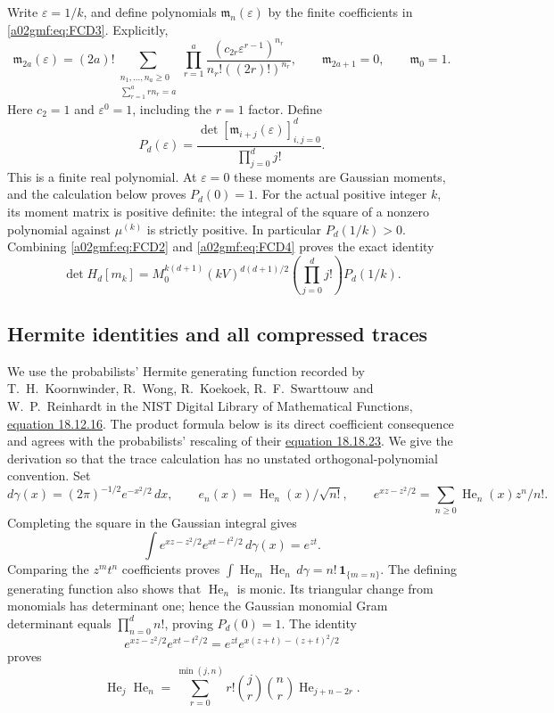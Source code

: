 \documentclass[11pt,a4paper]{article}
\begin{document}
Write \(\varepsilon=1/k\), and define polynomials \(\mathfrak m_n(\varepsilon)\)
by the finite coefficients in \eqref{a02gmf:eq:FCD3}. Explicitly,
\[
 \mathfrak m_{2a}(\varepsilon)
 =(2a)!\!
 \sum_{\substack{n_1,\ldots,n_a\ge0\\
                         \sum_{r=1}^a r n_r=a}}
 \prod_{r=1}^a
  \frac{(c_{2r}\varepsilon^{r-1})^{n_r}}
       {n_r!((2r)!)^{n_r}},
 \qquad \mathfrak m_{2a+1}=0,\qquad \mathfrak m_0=1.
\]
Here \(c_2=1\) and \(\varepsilon^0=1\), including the \(r=1\) factor.
Define
\begin{equation}
 P_d(\varepsilon)=
 \frac{\det[\mathfrak m_{i+j}(\varepsilon)]_{i,j=0}^{d}}
      {\prod_{j=0}^d j!}.
 \tag{FCD4}\label{a02gmf:eq:FCD4}
\end{equation}
This is a finite real polynomial. At \(\varepsilon=0\) these moments are
Gaussian moments, and the calculation below proves \(P_d(0)=1\).
For the actual positive integer \(k\), its moment matrix is positive
definite: the integral of the square of a nonzero polynomial against
\(\mu^{(k)}\) is strictly positive. In particular \(P_d(1/k)>0\).
Combining \eqref{a02gmf:eq:FCD2} and \eqref{a02gmf:eq:FCD4} proves the exact identity
\begin{equation}
 \boxed{\displaystyle
 \det H_d[m_k]=M_0^{k(d+1)}(kV)^{d(d+1)/2}
                    \left(\prod_{j=0}^d j!\right)P_d(1/k).}
 \tag{FCD5}\label{a02gmf:eq:FCD5}
\end{equation}

\subsection{Hermite identities and all compressed traces}

We use the probabilists' Hermite generating function recorded by
T.~H.~Koornwinder, R.~Wong, R.~Koekoek, R.~F.~Swarttouw and
W.~P.~Reinhardt in the NIST Digital Library of Mathematical Functions,
\href{https://dlmf.nist.gov/18.12.E16}{equation 18.12.16}.
The product formula below is its direct coefficient consequence and agrees
with the probabilists' rescaling of their
\href{https://dlmf.nist.gov/18.18.E23}{equation 18.18.23}.
We give the derivation so that the trace calculation has no unstated
orthogonal-polynomial convention.
Set
\[
 d\gamma(x)=(2\pi)^{-1/2}e^{-x^2/2}\,dx,\qquad
 e_n(x)=\operatorname{He}_n(x)/\sqrt{n!},\qquad
 e^{xz-z^2/2}=\sum_{n\ge0}\operatorname{He}_n(x)z^n/n!.
\]
Completing the square in the Gaussian integral gives
\[
 \int e^{xz-z^2/2}e^{xt-t^2/2}\,d\gamma(x)=e^{zt}.
\]
Comparing the \(z^mt^n\) coefficients proves
\(\int \operatorname{He}_m\operatorname{He}_n\,d\gamma
   =n!\,\mathbf1_{\{m=n\}}\).
The defining generating function also shows that
\(\operatorname{He}_n\) is monic. Its triangular change from monomials has
determinant one; hence the Gaussian monomial Gram determinant equals
\(\prod_{n=0}^d n!\), proving \(P_d(0)=1\).
The identity
\[
 e^{xz-z^2/2}e^{xt-t^2/2}
    =e^{zt}e^{x(z+t)-(z+t)^2/2}
\]
proves
\begin{equation}
 \operatorname{He}_j\operatorname{He}_n
   =\sum_{r=0}^{\min(j,n)}
       r!\binom jr\binom nr\operatorname{He}_{j+n-2r}.
 \tag{FCD6}\label{a02gmf:eq:FCD6}
\end{equation}
\end{document}
